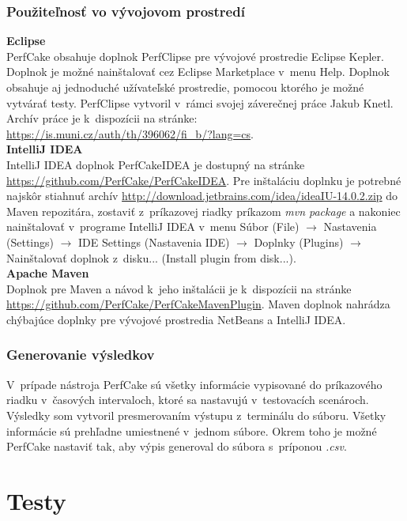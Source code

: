 \documentclass[12pt,oneside,final]{fithesis-utf8}
\begin{document}
\subsection{Použiteľnosť vo vývojovom prostredí}
\textbf{Eclipse}\\
PerfCake obsahuje doplnok PerfClipse pre vývojové prostredie Eclipse Kepler. Doplnok je možné nainštalovať cez Eclipse Marketplace v~menu Help. Doplnok obsahuje aj jednoduché užívateľské prostredie, pomocou ktorého je možné vytvárať testy. PerfClipse vytvoril v~rámci svojej záverečnej práce Jakub Knetl. Archív práce je k~dispozícii na stránke: \url{https://is.muni.cz/auth/th/396062/fi_b/?lang=cs}.\\

\noindent\textbf{IntelliJ IDEA}\\
IntelliJ IDEA doplnok PerfCakeIDEA je dostupný na stránke \url{https://github.com/PerfCake/PerfCakeIDEA}. Pre inštaláciu doplnku je potrebné najskôr stiahnuť archív \url{http://download.jetbrains.com/idea/ideaIU-14.0.2.zip} do Maven repozitára, zostaviť z~príkazovej riadky príkazom \textit{mvn package} a nakoniec nainštalovať v~programe IntelliJ IDEA v~menu Súbor (File) $\rightarrow$ Nastavenia (Settings) $\rightarrow$ IDE Settings (Nastavenia IDE) $\rightarrow$ Doplnky (Plugins) $\rightarrow$ Nainštalovať doplnok z~disku... (Install plugin from disk...)\cite{Michalko}.\\

\noindent\textbf{Apache Maven}\\
Doplnok pre Maven a návod k~jeho inštalácii je k~dispozícii na stránke \url{https://github.com/PerfCake/PerfCakeMavenPlugin}. Maven doplnok nahrádza chýbajúce doplnky pre vývojové prostredia NetBeans a IntelliJ IDEA.

\subsection{Generovanie výsledkov}
V~prípade nástroja PerfCake sú všetky informácie vypisované do príkazového riadku v~časových intervaloch, ktoré sa nastavujú v~testovacích scenároch. Výsledky som vytvoril presmerovaním výstupu z~terminálu do súboru. Všetky informácie sú prehľadne umiestnené v~jednom súbore. Okrem toho je možné PerfCake nastaviť tak, aby výpis generoval do súbora s~príponou \textit{.csv}.

\chapter{Testy}
\end{document}
